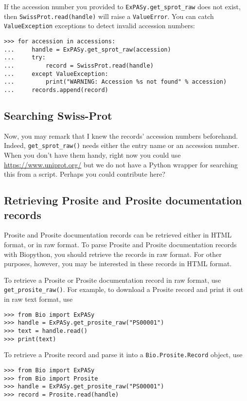 If the accession number you provided to \verb|ExPASy.get_sprot_raw| does not exist, then \verb|SwissProt.read(handle)| will raise a \verb|ValueError|. You can catch \verb|ValueException| exceptions to detect invalid accession numbers:

\begin{verbatim}
>>> for accession in accessions:
...     handle = ExPASy.get_sprot_raw(accession)
...     try:
...         record = SwissProt.read(handle)
...     except ValueException:
...         print("WARNING: Accession %s not found" % accession)
...     records.append(record)
\end{verbatim}

\subsection{Searching Swiss-Prot}

Now, you may remark that I knew the records' accession numbers
beforehand. Indeed, \verb|get_sprot_raw()| needs either the entry name
or an accession number. When you don't have them handy, right now you
could use \url{https://www.uniprot.org/} but we do not have a Python
wrapper for searching this from a script. Perhaps you could contribute
here?

\subsection{Retrieving Prosite and Prosite documentation records}

Prosite and Prosite documentation records can be retrieved either in HTML format, or in raw format. To parse Prosite and Prosite documentation records with Biopython, you should retrieve the records in raw format. For other purposes, however, you may be interested in these records in HTML format.

To retrieve a Prosite or Prosite documentation record in raw format, use \verb|get_prosite_raw()|. For example, to download a Prosite record and print it out in raw text format, use

\begin{verbatim}
>>> from Bio import ExPASy
>>> handle = ExPASy.get_prosite_raw("PS00001")
>>> text = handle.read()
>>> print(text)
\end{verbatim}

To retrieve a Prosite record and parse it into a \verb|Bio.Prosite.Record| object, use

\begin{verbatim}
>>> from Bio import ExPASy
>>> from Bio import Prosite
>>> handle = ExPASy.get_prosite_raw("PS00001")
>>> record = Prosite.read(handle)
\end{verbatim}

